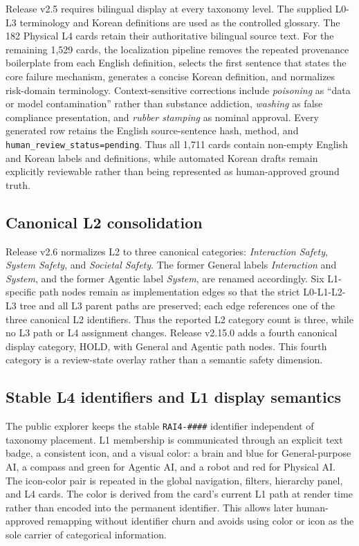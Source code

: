 \documentclass[11pt,a4paper]{article}
\newcommand{\code}[1]{\texttt{#1}}
\begin{document}
Release v2.5 requires bilingual display at every taxonomy level. The supplied
L0-L3 terminology and Korean definitions are used as the controlled glossary.
The 182 Physical L4 cards retain their authoritative bilingual source text. For
the remaining 1,529 cards, the localization pipeline removes the repeated
provenance boilerplate from each English definition, selects the first sentence
that states the core failure mechanism, generates a concise Korean definition,
and normalizes risk-domain terminology. Context-sensitive corrections include
\textit{poisoning} as ``data or model contamination'' rather than substance
addiction, \textit{washing} as false compliance presentation, and
\textit{rubber stamping} as nominal approval. Every generated row retains the
English source-sentence hash, method, and \code{human\_review\_status=pending}.
Thus all 1,711 cards contain non-empty English and Korean labels and definitions,
while automated Korean drafts remain explicitly reviewable rather than being
represented as human-approved ground truth.

\subsection{Canonical L2 consolidation}

Release v2.6 normalizes L2 to three canonical categories:
\textit{Interaction Safety}, \textit{System Safety}, and \textit{Societal
Safety}. The former General labels \textit{Interaction} and \textit{System},
and the former Agentic label \textit{System}, are renamed accordingly. Six
L1-specific path nodes remain as implementation edges so that the strict
L0-L1-L2-L3 tree and all L3 parent paths are preserved; each
edge references one of the three canonical L2 identifiers. Thus the reported
L2 category count is three, while no L3 path or L4 assignment changes. Release
v2.15.0 adds a fourth canonical display category, HOLD, with General and
Agentic path nodes. This fourth category is a review-state overlay rather than
a semantic safety dimension.

\subsection{Stable L4 identifiers and L1 display semantics}

The public explorer keeps the stable \code{RAI4-\#\#\#\#} identifier independent
of taxonomy placement. L1 membership is communicated through an explicit text
badge, a consistent icon, and a visual color: a brain and blue for
General-purpose AI, a compass and green for Agentic AI, and a robot and red for
Physical AI. The icon-color pair is repeated in the global navigation,
filters, hierarchy panel, and L4 cards. The color is derived from the card's current L1
path at render time rather than encoded into the permanent identifier. This
allows later human-approved remapping without identifier churn and avoids using
color or icon as the sole carrier of categorical information.
\end{document}
